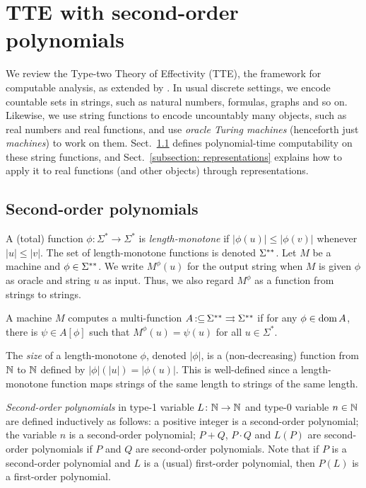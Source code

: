 \documentclass[envcountsame,orivec,oribibl]{llncs}
\newcommand{\pcolon}{\mathpunct{\,:\subseteq}}
\begin{document}
\section{TTE with second-order polynomials}
\label{section: computable analysis}

We review the Type-two Theory of Effectivity (TTE), 
the framework for computable analysis, 
as extended by 
\cite{kawamura2012complexity}. 
In usual discrete settings, we encode countable sets in strings, such as
natural numbers, formulas, graphs and so on. 
Likewise, 
we use string functions to 
encode uncountably many objects, such as real numbers and real functions, 
and use \emph{oracle Turing machines} (henceforth just \emph{machines}) 
to work on them.
Sect.~\ref{section:TTF} defines polynomial-time computability on 
these string functions, 
and Sect.~\ref{subsection: representations} explains how to 
apply it to real functions (and other objects) through representations. 

\subsection{Second-order polynomials}
\label{section:TTF}

A (total) function $\phi \colon \Sigma^* \to \Sigma^*$ is \emph{length-monotone}
if $|\phi(u)| \le |\phi(v)|$ whenever $|u| \le |v|$.
The set of length-monotone functions is denoted $\Sigma ^{**}$.
Let $M$ be a machine and $\phi \in \Sigma ^{**}$. 
We write $M ^\phi (u)$ for the output string 
when $M$ is given
$\phi$ as oracle and string $u$ as input.
Thus, we also regard $M^\phi$ as a function from strings to strings.

\begin{definition}
 A machine $M$ computes a multi-function $A \pcolon \LM \rightrightarrows \LM$ if for any
 $\phi \in \mathop{\rm dom} A$, there is $\psi \in A[\phi]$ such that $M^\phi(u) = \psi(u)$ for all $u \in \Sigma^*$.
\end{definition}

The \emph{size} of a length-monotone $\phi$, denoted $|\phi|$,
is a (non-decreasing) function from $\mathbb N$ to $\mathbb N$ defined by 
$|\phi|(|u|) = |\phi(u)|$.
This is well-defined since a length-monotone function maps 
strings of the same length to strings of the same length.

\emph{Second-order polynomials} in type-1 variable $L \colon \mathbb N \to \mathbb N$
and type-0 variable $n \in \mathbb N$ 
are defined inductively as follows:
a positive integer is a second-order polynomial;
the variable $n$ is a second-order polynomial;
$P+Q$, $P \cdot Q$ and $L(P)$ are
second-order polynomials if $P$ and $Q$ are second-order polynomials.
Note that if $P$ is a second-order polynomial and $L$ is a (usual) first-order
polynomial, then $P(L)$ is a first-order polynomial.
\end{document}

